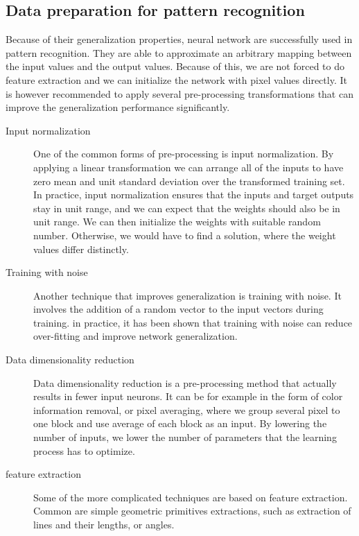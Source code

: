 \subsection{Data preparation for pattern recognition}
\cite{bishop} Because of their generalization properties, neural network are successfully used in pattern recognition. They are able to approximate an arbitrary mapping between the input values and the output values. Because of this, we are not forced to do feature extraction and we can initialize the network with pixel values directly. 
It is however recommended to apply several pre-processing transformations that can improve the generalization performance significantly.
\begin{description}
\item [Input normalization]
One of the common forms of pre-processing is input normalization. By applying a linear transformation we can arrange all of the inputs to have zero mean and unit standard deviation over the transformed training set.
In practice, input normalization ensures that the inputs and target outputs stay in unit range, and we can expect that the weights should also be in unit range. We can then initialize the weights with suitable random number. Otherwise, we would have to find a solution, where the weight values differ distinctly.
\item [Training with noise]
Another technique that improves generalization is training with noise. It involves the addition of a random vector to the input vectors during training. in practice, it has been shown that training with noise can reduce over-fitting and improve network generalization.
\item [Data dimensionality reduction]
Data dimensionality reduction is a pre-processing method that actually results in fewer input neurons. It can be for example in the form of color information removal, or pixel averaging, where we group several pixel to one block and use average of each block as an input. By lowering the number of inputs, we lower the number of parameters that the learning process has to optimize.
\item [feature extraction]
Some of the more complicated techniques are based on feature extraction. Common are simple geometric primitives extractions, such as extraction of lines and their lengths, or angles. 
\end{description}
